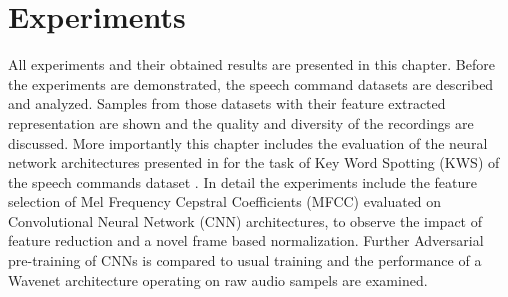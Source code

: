
\chapter{Experiments}\label{sec:exp}
All experiments and their obtained results are presented in this chapter.
Before the experiments are demonstrated, the speech command datasets are described and analyzed.
Samples from those datasets with their feature extracted representation are shown and the quality and diversity of the recordings are discussed.
More importantly this chapter includes the evaluation of the neural network architectures presented in  for the task of Key Word Spotting (KWS) of the speech commands dataset \cite{Warden2018}.
In detail the experiments include the feature selection of Mel Frequency Cepstral Coefficients (MFCC) evaluated on Convolutional Neural Network (CNN) architectures, to observe the impact of feature reduction and a novel frame based normalization.
Further Adversarial pre-training of CNNs is compared to usual training and the performance of a Wavenet architecture operating on raw audio sampels are examined.







%


